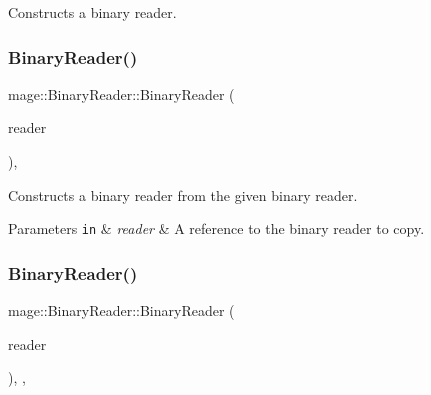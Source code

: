 Constructs a binary reader. \mbox{\label{classmage_1_1_binary_reader_a8c1ff948f1d056439f3d8cc37d7f507c}} 
\subsubsection{\texorpdfstring{Binary\+Reader()}{BinaryReader()}\hspace{0.1cm}{\footnotesize\ttfamily [2/3]}}
{\footnotesize\ttfamily mage\+::\+Binary\+Reader\+::\+Binary\+Reader (\begin{DoxyParamCaption}\item[{const \mbox{\hyperlink{classmage_1_1_binary_reader}{Binary\+Reader}} \&}]{reader }\end{DoxyParamCaption})\hspace{0.3cm}{\ttfamily [protected]}, {\ttfamily [delete]}}

Constructs a binary reader from the given binary reader.


\begin{DoxyParams}[1]{Parameters}
\mbox{\tt in}  & {\em reader} & A reference to the binary reader to copy. \\
\hline
\end{DoxyParams}
\mbox{\label{classmage_1_1_binary_reader_a520841747b74b4b0e95f8d9b595492fa}} 
\subsubsection{\texorpdfstring{Binary\+Reader()}{BinaryReader()}\hspace{0.1cm}{\footnotesize\ttfamily [3/3]}}
{\footnotesize\ttfamily mage\+::\+Binary\+Reader\+::\+Binary\+Reader (\begin{DoxyParamCaption}\item[{\mbox{\hyperlink{classmage_1_1_binary_reader}{Binary\+Reader}} \&\&}]{reader }\end{DoxyParamCaption})\hspace{0.3cm}{\ttfamily [protected]}, {\ttfamily [default]}, {\ttfamily [noexcept]}}

